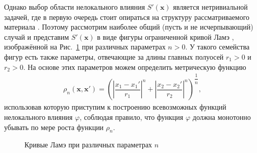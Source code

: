 Однако выбор области нелокального влияния $S'(\boldsymbol{x})$ является нетривиальной задачей, где в первую очередь стоит опираться на структуру рассматриваемого материала \cite{Eringen3}. Поэтому рассмотрим наиболее общий (пусть и не исчерпывающий) случай и представим $S'(\boldsymbol{x})$ в виде фигуры ограниченной кривой Ламэ \cite{Superellipse}, изображённой на Рис.~\ref{fig:SuperEllipse} при различных параметрах $n > 0$. У такого семейства фигур есть также параметры, отвечающие за длины главных полуосей $r_1 > 0$ и $r_2 > 0$. На основе этих параметров можем определить метрическую функцию
\begin{gather}
	\label{eq:metricFunction}
	\rho_n(\boldsymbol{x}, \boldsymbol{x}') = 
	\left(
		\left| \dfrac{x_1 - x_1'}{r_1} \right|^n +
		\left| \dfrac{x_2 - x_2'}{r_2} \right|^n
	\right)^{\dfrac{1}{n}},
\end{gather}
использовав которую приступим к построению всевозможных функций нелокального влияния $\varphi$, соблюдая правило, что функция $\varphi$ должна монотонно убывать по мере роста функции $\rho_n$.

\begin{figure}[ht]
    \caption{Кривые Ламэ при различных параметрах $n$}\label{fig:SuperEllipse}
\end{figure}


